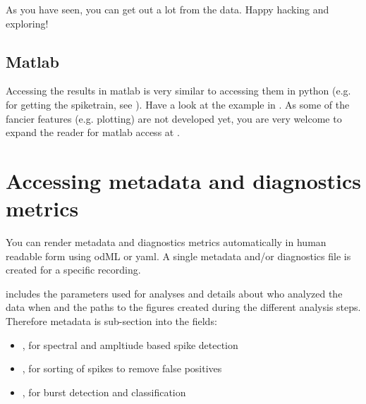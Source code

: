 \documentclass[letterpaper,10pt,english]{sphinxmanual}
\begin{document}
\begin{sphinxVerbatim}[commandchars=\\\{\}]
\PYG{g+go}{array([ 445.338     ,  846.258     ,  860.334     , 1031.31      ,}
\PYG{g+go}{       4759.026     ])}
\end{sphinxVerbatim}

As you have seen, you can get out a lot from the data. Happy hacking and exploring!


\section{Matlab}
\label{\detokenize{access_results:matlab}}\label{\detokenize{access_results:matlab-access}}
Accessing the results in matlab is very similar to accessing them in python (e.g.  for getting the spiketrain, see
{\hyperref[\detokenize{access_results:python-access}]{}}).
Have a look at the example in . As some of the fancier features (e.g. plotting)
are not developed yet, you are very welcome to expand the reader for matlab access at .


\chapter{Accessing metadata and diagnostics metrics}
\label{\detokenize{access_metadata:accessing-metadata-and-diagnostics-metrics}}\label{\detokenize{access_metadata:access-metadata}}\label{\detokenize{access_metadata::doc}}
You can render metadata and diagnostics metrics automatically in human readable form using odML or yaml. A single metadata
and/or diagnostics file is created for a specific recording.

 includes the parameters used for analyses and details about who analyzed the data when and the paths to the
figures created during the different analysis steps. Therefore metadata is sub-section into the fields:
\begin{itemize}
\item {} 
, for spectral and ampltiude based spike detection

\item {} 
, for sorting of spikes to remove false positives

\item {} 
, for burst detection and classification

\end{itemize}
\end{document}
